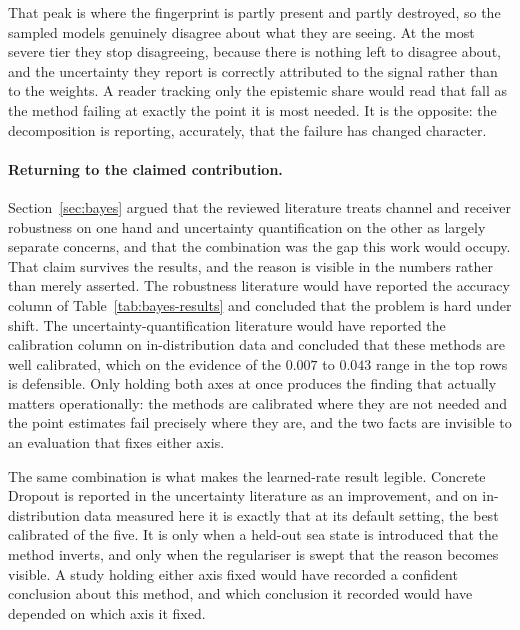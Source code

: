 \documentclass{article}
\begin{document}
That peak is where the fingerprint is partly present and partly destroyed, so
the sampled models genuinely disagree about what they are seeing. At the most
severe tier they stop disagreeing, because there is nothing left to disagree
about, and the uncertainty they report is correctly attributed to the signal
rather than to the weights. A reader tracking only the epistemic share would
read that fall as the method failing at exactly the point it is most needed.
It is the opposite: the decomposition is reporting, accurately, that the
failure has changed character.

\paragraph{Returning to the claimed contribution.}
Section~\ref{sec:bayes} argued that the reviewed literature treats channel and
receiver robustness on one hand and uncertainty quantification on the other as
largely separate concerns, and that the combination was the gap this work would
occupy. That claim survives the results, and the reason is visible in the
numbers rather than merely asserted. The robustness literature would have
reported the accuracy column of Table~\ref{tab:bayes-results} and concluded that
the problem is hard under shift. The uncertainty-quantification literature would
have reported the calibration column on in-distribution data and concluded that
these methods are well calibrated, which on the evidence of the $0.007$ to
$0.043$ range in the top rows is defensible. Only holding both axes at once
produces the finding that actually matters operationally: the methods are
calibrated where they are not needed and the point estimates fail precisely
where they are, and the two facts are invisible to an evaluation that fixes
either axis.

The same combination is what makes the learned-rate result legible. Concrete
Dropout is reported in the uncertainty literature as an improvement, and on
in-distribution data measured here it is exactly that at its default setting,
the best calibrated of the five. It is only when a held-out sea state is
introduced that the method inverts, and only when the regulariser is swept that
the reason becomes visible. A study holding either axis fixed would have
recorded a confident conclusion about this method, and which conclusion it
recorded would have depended on which axis it fixed.
\end{document}
